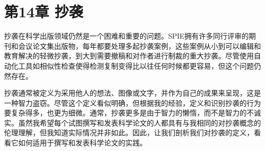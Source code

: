 \section*{第14章 抄袭}
抄袭在科学出版领域仍然是一个困难和重要的问题。SPIE拥有许多同行评审的期刊和会议论文集出版物，每年都要处理多起抄袭案例，这些案例从小到可以编辑和教育解决的轻微抄袭，到大到需要撤稿和对作者进行制裁的重大抄袭。尽管使用自动化工具如相似性检查使得检测复制变得比以往任何时候都更容易，但这个问题仍然存在。

抄袭通常被定义为采用他人的想法、图像或文字，并作为自己的成果来呈现，这是一种智力盗窃。尽管这个定义看似明确，但根据我的经验，定义和识别抄袭的行为要复杂得多，也更为细微。通常，抄袭更多是由于智力的懒惰，而不是智力的不诚实。虽然我希望每个试图撰写和发表科学论文的人都具有与我相同的对抄袭概念的伦理理解，但我知道实际情况并非如此。因此，让我们剖析我们对抄袭的定义，看看它如何适用于撰写和发表科学论文的实践。

